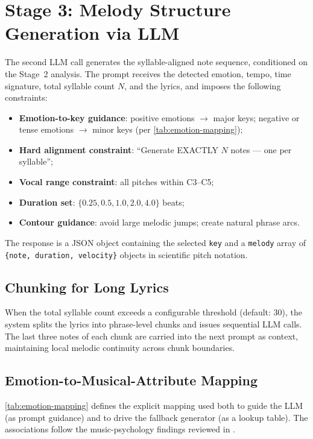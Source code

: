 \section{Stage 3: Melody Structure Generation via LLM}
\label{sec:mt-stage3}

The second LLM call generates the syllable-aligned note sequence,
conditioned on the Stage~2 analysis. The prompt receives the detected
emotion, tempo, time signature, total syllable count $N$, and the lyrics,
and imposes the following constraints:

\begin{itemize}
    \item \textbf{Emotion-to-key guidance}: positive emotions
    $\rightarrow$ major keys; negative or tense emotions $\rightarrow$
    minor keys (per \ref{tab:emotion-mapping});
    \item \textbf{Hard alignment constraint}: \enquote{Generate EXACTLY $N$
    notes --- one per syllable};
    \item \textbf{Vocal range constraint}: all pitches within C3--C5;
    \item \textbf{Duration set}: $\{0.25, 0.5, 1.0, 2.0, 4.0\}$ beats;
    \item \textbf{Contour guidance}: avoid large melodic jumps; create
    natural phrase arcs.
\end{itemize}

The response is a JSON object containing the selected \texttt{key} and a
\texttt{melody} array of \texttt{\{note, duration, velocity\}} objects in
scientific pitch notation.

\subsection{Chunking for Long Lyrics}
\label{sec:mt-chunking}

When the total syllable count exceeds a configurable threshold (default:
30), the system splits the lyrics into phrase-level chunks and issues
sequential LLM calls. The last three notes of each chunk are carried into
the next prompt as context, maintaining local melodic continuity across
chunk boundaries.

\subsection{Emotion-to-Musical-Attribute Mapping}
\label{sec:mt-mapping}

\ref{tab:emotion-mapping} defines the explicit mapping used both to
guide the LLM (as prompt guidance) and to drive the fallback generator (as a
lookup table). The associations follow the music-psychology findings
reviewed in  \cite{hevner36expression,
juslin01musicemotion, gabrielsson10emotion}.

